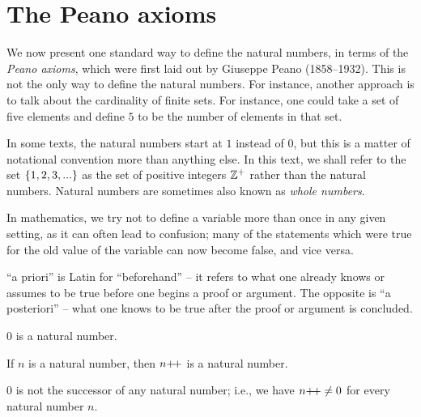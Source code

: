 \section{The Peano axioms}\label{i:sec:2.1}

\begin{note}
  We now present one standard way to define the natural numbers, in terms of the \emph{Peano axioms}, which were first laid out by Giuseppe Peano (1858--1932).
  This is not the only way to define the natural numbers.
  For instance, another approach is to talk about the cardinality of finite sets.
  For instance, one could take a set of five elements and define \(5\) to be the number of elements in that set.
\end{note}

\begin{note}
  In some texts, the natural numbers start at \(1\) instead of \(0\), but this is a matter of notational convention more than anything else.
  In this text, we shall refer to the set \(\left\lbrace1, 2, 3,...\right\rbrace\) as the set of positive integers \(\mathbb{Z}^+\) rather than the natural numbers.
  Natural numbers are sometimes also known as \emph{whole numbers}.
\end{note}

\begin{note}
  In mathematics, we try not to define a variable more than once in any given setting, as it can often lead to confusion;
  many of the statements which were true for the old value of the variable can now become false, and vice versa.
\end{note}

\begin{note}
  ``a priori'' is Latin for ``beforehand''
  -- it refers to what one already knows or assumes to be true before one begins a proof or argument.
  The opposite is ``a posteriori''
  -- what one knows to be true after the proof or argument is concluded.
\end{note}

\begin{ax}\label{i:2.1}
  \(0\) is a natural number.
\end{ax}

\begin{ax}\label{i:2.2}
  If \(n\) is a natural number, then \(n{+}\!{+}\) is a natural number.
\end{ax}

\begin{ax}\label{i:2.3}
  \(0\) is not the successor of any natural number;
  i.e., we have \(n{+}\!{+} \neq 0\) for every natural number \(n\).
\end{ax}


